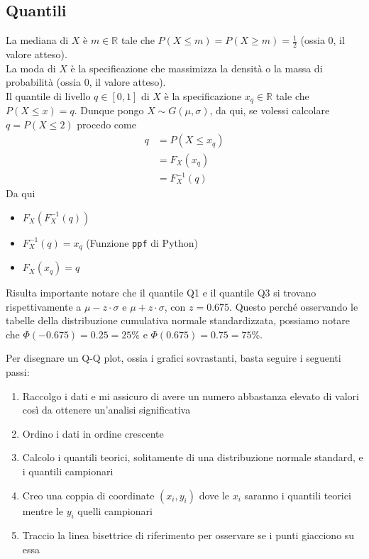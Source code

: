\documentclass[11pt]{report}
\begin{document}
\subsection{Quantili}
La mediana di $X$ è $m \in \mathbb{R}$ tale che $P(X \leq m) = P(X \geq m) = \frac{1}{2}$ (ossia 0, il valore atteso).\\
La moda di $X$ è la specificazione che massimizza la densità o la massa di probabilità (ossia 0, il valore atteso).\\
Il quantile di livello $q \in [0,1]$ di $X$ è la specificazione $x_q \in \mathbb{R}$ tale che $P(X \leq x) = q$. Dunque pongo $X \sim G(\mu,\sigma)$, da qui, se volessi calcolare $q = P(X \leq 2)$ procedo come
\begin{equation}
    \begin{split}
        q & = P(X \leq x_q)\\
        & = F_X(x_q)\\
        & = F_X^{-1}(q)
    \end{split}
\end{equation}
Da qui
\begin{itemize}
    \item $F_X \left( F_X^{-1}(q) \right)$
    \item $F_X^{-1}(q) = x_q$ (Funzione \texttt{ppf} di Python)
    \item $F_X(x_q) = q$
\end{itemize}
\begin{center}
    
\end{center}
Risulta importante notare che il quantile Q1 e il quantile Q3 si trovano rispettivamente a $\mu - z \cdot \sigma$ e $\mu + z \cdot \sigma$, con $z = 0.675$. Questo perché osservando le tabelle della distribuzione cumulativa normale standardizzata, possiamo notare che $\Phi(-0.675) = 0.25 = 25\%$ e $\Phi(0.675) = 0.75 = 75\%$.
\begin{center}
    
\end{center}
Per disegnare un Q-Q plot, ossia i grafici sovrastanti, basta seguire i seguenti passi:
\begin{enumerate}
	\item Raccolgo i dati e mi assicuro di avere un numero abbastanza elevato di valori così da ottenere un'analisi significativa
	\item Ordino i dati in ordine crescente
	\item Calcolo i quantili teorici, solitamente di una distribuzione normale standard, e i quantili campionari
	\item Creo una coppia di coordinate $(x_i, y_i)$ dove le $x_i$ saranno i quantili teorici mentre le $y_i$ quelli campionari
	\item Traccio la linea bisettrice di riferimento per osservare se i punti giacciono su essa
\end{enumerate}
\end{document}
